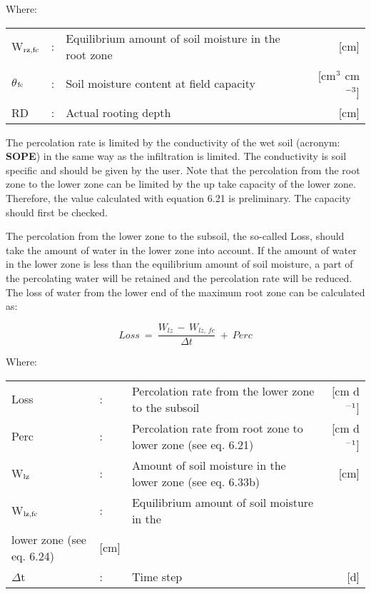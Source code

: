 Where:\\
\begin{tabularx}{\textwidth}{llXr}
W$_{{\rm rz,fc}}$ &:& Equilibrium amount of soil moisture in the root zone  & [cm]\\
$\theta$$_{{\rm fc}}$ &:& Soil moisture content at field capacity  & [cm$^{{\rm 3}}$ cm$^{{\rm -3}}$]\\
RD &:& Actual rooting depth  & [cm]\\
\end{tabularx}



The percolation rate is limited by the conduc\-tivity of the wet soil (acronym: {\bf SOPE}) in the
same way as the infiltration is limited. The conductivity is soil specific and should be
given by the user. Note that the percolation from the root zone to the lower zone can be
limited by the up take capacity of the lower zone. Therefore, the value calculated with 
equation 6.21 is preliminary. The capacity should first be checked.

The percolation from the lower zone to the subsoil, the so-called Loss, should take the
amount of water in the lower zone into account. If the amount of water in the lower zone
is less than the equilibrium amount of soil moisture, a part of the percolating water will
be retained and the percolation rate will be reduced. The loss of water from the lower end
of the maximum root zone can be calculated as:

\begin{equation}
Loss ~=~{\frac{W _{lz} \, -\, W _{lz,\, fc} }{\Delta t}} ~+~ Perc
\end{equation}

Where:\\
\begin{tabularx}{\textwidth}{llXr}
Loss &:& Percolation rate from the lower zone to the subsoil   & [cm d$^{{\rm -1}}$]\\
Perc &:& Percolation rate from root zone to lower zone (see eq. 6.21)  & [cm d$^{{\rm -1}}$]\\
W$_{{\rm lz}}$ &:& Amount of soil moisture in the lower zone (see eq. 6.33b)  & [cm]\\
W$_{{\rm lz,fc}}$ &:& Equilibrium amount of soil moisture in the\\
   lower zone (see eq. 6.24)  & [cm]\\
$\Delta$t &:& Time step   & [d]\\
\end{tabularx}

